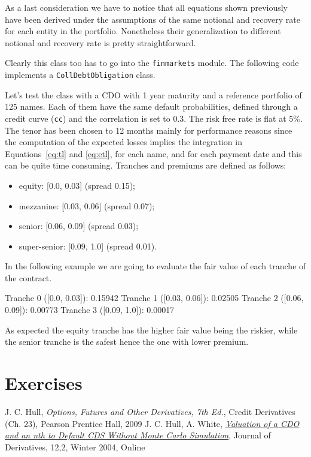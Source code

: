 As a last consideration we have to notice that all equations shown previously have been derived under the assumptions of the same notional and recovery rate for each entity in the portfolio. Nonetheless their generalization to different notional and recovery rate is pretty straightforward.
 
\begin{finmarkets}
Clearly this class too has to go into the \texttt{finmarkets} module. The following code implements a \texttt{CollDebtObligation} class.
\end{finmarkets}


Let's test the class with a CDO with 1 year maturity and a reference portfolio of 125 names. Each of them have the same default probabilities, defined through a credit curve (\texttt{cc}) and the correlation is set to 0.3. The risk free rate is flat at 5\%. The tenor has been chosen to 12 months mainly for performance reasons since the computation of the expected losses implies the integration in Equations~\ref{eq:tl} and \ref{eq:etl}, for each name, and for each payment date and this can be quite time consuming.
Tranches and premiums are defined as follows:
\begin{itemize}
	\item equity: [0.0, 0.03] (spread 0.15);
	\item mezzanine: [0.03, 0.06] (spread 0.07);
	\item senior: [0.06, 0.09] (spread 0.03);
	\item super-senior: [0.09, 1.0] (spread 0.01).
\end{itemize}

In the following example we are going to evaluate the fair value of each tranche of the contract.


\begin{ioutput}
Tranche 0 ([0.0, 0.03]): 0.15942
Tranche 1 ([0.03, 0.06]): 0.02505
Tranche 2 ([0.06, 0.09]): 0.00773
Tranche 3 ([0.09, 1.0]): 0.00017
\end{ioutput}

As expected the equity tranche has the higher fair value being the riskier, while the senior tranche is the safest hence the one with lower premium.

\section*{Exercises}


\begin{thebibliography}{9}
 J. C. Hull, \emph{Options, Futures and Other Derivatives, 7th Ed.}, Credit Derivatives (Ch. 23), Pearson Prentice Hall, 2009
 J. C. Hull, A. White, \href{http://www-2.rotman.utoronto.ca/~hull/downloadablepublications/HullWhiteCDOPaper.pdf}{\emph{Valuation of a CDO and an nth to Default CDS Without Monte Carlo Simulation}}, Journal of Derivatives, 12,2, Winter 2004,  Online 
\end{thebibliography}
